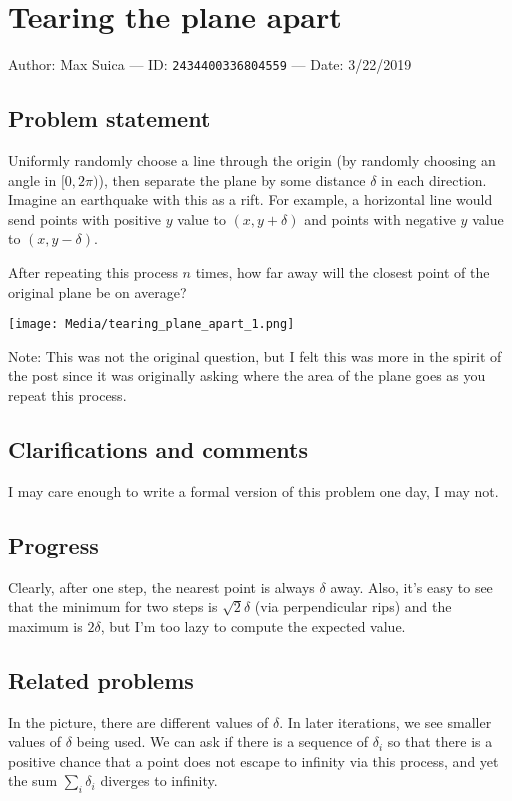 
\section{Tearing the plane apart}

Author: Max Suica --- ID: \verb`2434400336804559` --- Date: 3/22/2019

\subsection{Problem statement}

Uniformly randomly choose a line through the origin (by randomly choosing an angle in $[0,2\pi)$), then separate the plane by some distance $\delta$ in each direction. Imagine an earthquake with this as a rift. For example, a horizontal line would send points with positive $y$ value to $(x,y+\delta)$ and points with negative $y$ value to $(x,y-\delta)$.

After repeating this process $n$ times, how far away will the closest point of the original plane be on average?

\BlankLine

\texttt{[image: Media/tearing\_plane\_apart\_1.png]}

Note: This was not the original question, but I felt this was more in the spirit of the post since it was originally asking where the area of the plane goes as you repeat this process.

\subsection{Clarifications and comments}

I may care enough to write a formal version of this problem one day, I may not.

\subsection{Progress}

Clearly, after one step, the nearest point is always $\delta$ away. Also, it's easy to see that the minimum for two steps is $\sqrt2\delta$ (via perpendicular rips) and the maximum is $2\delta$, but I'm too lazy to compute the expected value.

\subsection{Related problems}

In the picture, there are different values of $\delta$. In later iterations, we see smaller values of $\delta$ being used. We can ask if there is a sequence of $\delta_i$ so that there is a positive chance that a point does not escape to infinity via this process, and yet the sum $\sum_i\delta_i$ diverges to infinity.

